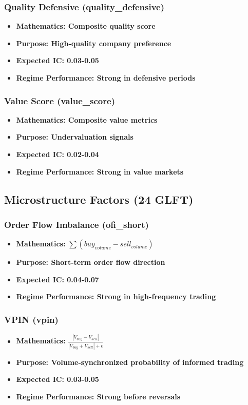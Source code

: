 \documentclass[11pt,letterpaper,openany]{book}
\begin{document}
\subsubsection{Quality Defensive (quality\_defensive)}
\begin{itemize}
    \item \textbf{Mathematics: Composite quality score}
    \item \textbf{Purpose: High-quality company preference}
    \item \textbf{Expected IC: 0.03-0.05}
    \item \textbf{Regime Performance: Strong in defensive periods}
\end{itemize}

\subsubsection{Value Score (value\_score)}
\begin{itemize}
    \item \textbf{Mathematics: Composite value metrics}
    \item \textbf{Purpose: Undervaluation signals}
    \item \textbf{Expected IC: 0.02-0.04}
    \item \textbf{Regime Performance: Strong in value markets}
\end{itemize}

\subsection{Microstructure Factors (24 GLFT)}

\subsubsection{Order Flow Imbalance (ofi\_short)}
\begin{itemize}
    \item \textbf{Mathematics:} $\sum (buy_{volume} - sell_{volume})$
    \item \textbf{Purpose: Short-term order flow direction}
    \item \textbf{Expected IC: 0.04-0.07}
    \item \textbf{Regime Performance: Strong in high-frequency trading}
\end{itemize}

\subsubsection{VPIN (vpin)}
\begin{itemize}
    \item \textbf{Mathematics:} $\frac{|V_{buy} - V_{sell}|}{|V_{buy} + V_{sell}| + \epsilon}$
    \item \textbf{Purpose: Volume-synchronized probability of informed trading}
    \item \textbf{Expected IC: 0.03-0.05}
    \item \textbf{Regime Performance: Strong before reversals}
\end{itemize}
\end{document}
